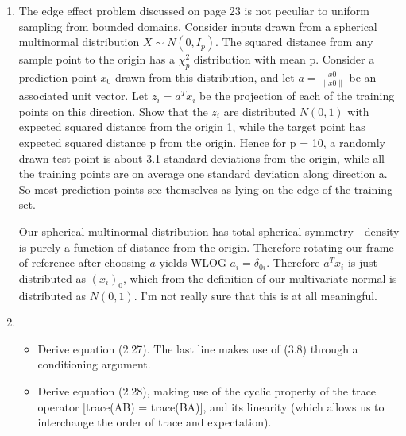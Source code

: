 \documentclass{article}
\newcommand{\chapternumber}{1}
\newenvironment{QandA}{\begin{enumerate}[label=\chapternumber.\arabic*]\bfseries\boldmath}
	{\end{enumerate}}
\newenvironment{answered}{\par\bigskip\normalfont\unboldmath}{}
\begin{document}
\begin{QandA}
	\item The edge effect problem discussed on page 23 is not peculiar to
	uniform sampling from bounded domains. Consider inputs drawn from a
	spherical multinormal distribution $X \sim N (0,I_p)$. The squared distance
	from any sample point to the origin has a $\chi^2_p$ distribution with mean p.
	Consider a prediction point $x_0$ drawn from this distribution, and let $a =
	\frac{x0}{\|x0\|}$ be an associated unit vector. Let $z_i = a^Tx_i$ be the projection of
	each of the training points on this direction.
	Show that the $z_i$ are distributed $N (0, 1)$ with expected squared distance
	from the origin 1, while the target point has expected squared distance p
	from the origin.
	Hence for p = 10, a randomly drawn test point is about 3.1 standard
	deviations from the origin, while all the training points are on average
	one standard deviation along direction a. So most prediction points see
	themselves as lying on the edge of the training set.
	
	\begin{answered}
		Our spherical multinormal distribution has total spherical symmetry - density is purely a function of distance from the origin. Therefore rotating our frame of reference after choosing $a$ yields WLOG $a_i=\delta_{0i}$. Therefore $a^Tx_i$ is just distributed as $(x_i)_0$, which from the definition of our multivariate normal is distributed as $N(0,1)$.
		I'm not really sure that this is at all meaningful.
	\end{answered}

	\item 
	\begin{itemize}
		\item Derive equation (2.27). The last line makes use of (3.8) through a
		conditioning argument.
		\item Derive equation (2.28), making use of the cyclic property of the trace
		operator [trace(AB) = trace(BA)], and its linearity (which allows us
		to interchange the order of trace and expectation).
	\end{itemize}
	
	\end{QandA}
	
\end{document}
